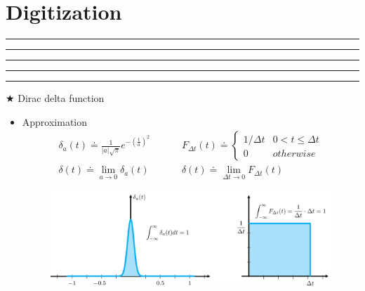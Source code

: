 \setcounter{chapter}{7}
\setcounter{section}{0}
\section{Digitization}
\vspace{-8pt} \hrule \hrule \hrule \hrule \hrule  \vspace{12pt}

$\bigstar$ Dirac delta function 
\begin{itemize}
	\item Approximation
	\begin{align*}
		\delta_a(t) \doteq \frac{1}{|a| \sqrt{\pi}}e^{-{\left( \frac{t}{a} \right)}^2} &&&& F_{\Delta t}(t) \doteq  \begin{cases}1/\Delta t & 0 < t \leq \Delta t \\0 & otherwise \end{cases}\\
		\delta(t) \doteq \lim_{a \rightarrow 0} \delta_a(t) &&&& \delta(t) \doteq  \lim_{\Delta t\rightarrow 0} F_{\Delta t}(t) 
	\end{align*}

	    \begin{figure}[!h]
	        \centering
	        \includegraphics[width=18cm]{./FIG_Franklin/fig8-smc2.png}
	    \end{figure}

\end{itemize}


